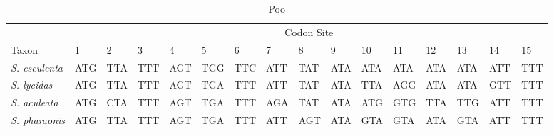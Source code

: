 \setlength\tabcolsep{0 pt}
\begin{table}[h!]
  \begin{tabular}{llllllllllllllll}
                        & \multicolumn{15}{c}{Codon Site}                                                         \\
    \cmidrule(lr){2-16}
    Taxon               & 1   & 2   & 3   & 4   & 5   & 6   & 7   & 8   & 9   & 10  & 11  & 12  & 13  & 14  & 15  \\
    \cmidrule(lr){1-1}
    \emph{S. esculenta} & ATG & \cellcolor{lightgray}TTA & TTT & \cellcolor{lightgray}AGT & TGG & \cellcolor{lightgray}TTC & ATT & \cellcolor{lightgray}TAT & ATA & \cellcolor{lightgray}ATA & ATA & \cellcolor{lightgray}ATA & ATA & \cellcolor{lightgray}ATT & TTT \\
    \emph{S. lycidas}   & ATG & \cellcolor{lightgray}TTA & TTT & \cellcolor{lightgray}AGT & TGA & \cellcolor{lightgray}TTT & ATT & \cellcolor{lightgray}TAT & ATA & \cellcolor{lightgray}TTA & AGG & \cellcolor{lightgray}ATA & ATA & \cellcolor{lightgray}GTT & TTT \\
    \emph{S. aculeata}  & ATG & \cellcolor{lightgray}CTA & TTT & \cellcolor{lightgray}AGT & TGA & \cellcolor{lightgray}TTT & AGA & \cellcolor{lightgray}TAT & ATA & \cellcolor{lightgray}ATG & GTG & \cellcolor{lightgray}TTA & TTG & \cellcolor{lightgray}ATT & TTT \\
    \emph{S. pharaonis} & ATG & \cellcolor{lightgray}TTA & TTT & \cellcolor{lightgray}AGT & TGA & \cellcolor{lightgray}TTT & ATT & \cellcolor{lightgray}AGT & ATA & \cellcolor{lightgray}GTA & GTA & \cellcolor{lightgray}ATA & GTA & \cellcolor{lightgray}ATT & TTT \\
  \end{tabular}
  \caption{Poo}
  \label{tab:cuttlealign}
\end{table}
\setlength\tabcolsep{6 pt}